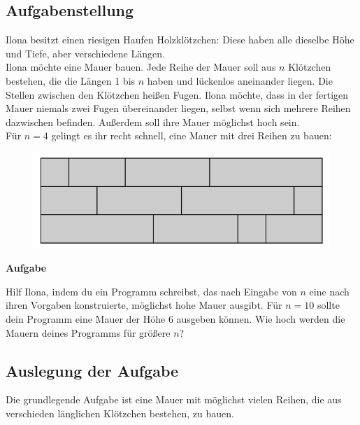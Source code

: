 \documentclass[a4paper,12pt]{article}
\begin{document}
\subsection{Aufgabenstellung}
Ilona besitzt einen riesigen Haufen Holzklötzchen: Diese haben alle dieselbe Höhe und Tiefe,
aber verschiedene Längen. \\
Ilona möchte eine Mauer bauen. Jede Reihe der Mauer soll aus $n$ Klötzchen bestehen, die die
Längen 1 bis $n$ haben und lückenlos aneinander liegen. Die Stellen zwischen den Klötzchen heißen
Fugen. Ilona möchte, dass in der fertigen Mauer niemals zwei Fugen übereinander liegen,
selbst wenn sich mehrere Reihen dazwischen befinden. Außerdem soll ihre Mauer möglichst
hoch sein. \\
Für $n = 4$ gelingt es ihr recht schnell, eine Mauer mit drei Reihen zu bauen:
\begin{figure}[H]
    \includegraphics[width=0.7\linewidth]{Bilder/Aufgabe1/Aufgabenstellung_BeispielMauer.png}
\end{figure}
\begin{large}
    \textbf{Aufgabe} \\
\end{large}
Hilf Ilona, indem du ein Programm schreibst, das nach Eingabe von $n$ eine nach ihren Vorgaben
konstruierte, möglichst hohe Mauer ausgibt. Für $n = 10$ sollte dein Programm eine Mauer der
Höhe 6 ausgeben können. Wie hoch werden die Mauern deines Programms für größere $n$?

\subsection{Auslegung der Aufgabe}
Die grundlegende Aufgabe ist eine Mauer mit möglichst vielen Reihen, die aus verschieden länglichen Klötzchen bestehen, zu bauen.
\end{document}
